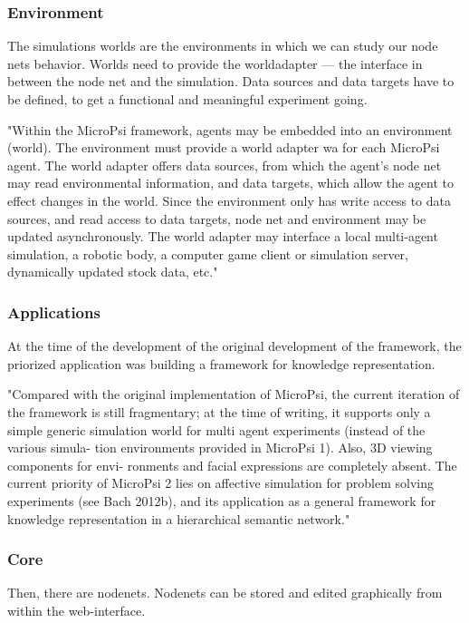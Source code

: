             \subsubsection{Environment}
The simulations worlds are the environments in which we can study our node nets behavior. Worlds need to provide the worldadapter --- the interface in between the node net and the simulation. Data sources and data targets have to be defined, to get a functional and meaningful experiment going.~\cite{conf/agi/Bach12}
                
"Within the MicroPsi framework, agents may be embedded into an environment (world). The environment must provide a world adapter wa for each MicroPsi agent. The world adapter offers data sources, from which the agent’s node net may read environmental information, and data targets, which allow the agent to effect changes in the world. Since the environment only has write access to data sources, and read access to data targets, node net and environment may be updated asynchronously.
The world adapter may interface a local multi-agent simulation, a robotic body, a computer game client or simulation server, dynamically updated stock data, etc."~\cite{conf/agi/Bach12}

            \subsubsection{Applications}
At the time of the development of the original development of the framework, the priorized application was building a framework for knowledge representation.~\cite{conf/agi/Bach12}

"Compared with the original implementation of MicroPsi, the current iteration of the framework is still fragmentary; at the time of writing, it supports only a simple generic simulation world for multi agent experiments (instead of the various simula- tion environments provided in MicroPsi 1). Also, 3D viewing components for envi- ronments and facial expressions are completely absent.
The current priority of MicroPsi 2 lies on affective simulation for problem solving experiments (see Bach 2012b), and its application as a general framework for knowledge representation in a hierarchical semantic network."~\cite{conf/agi/Bach12}


            \subsubsection{Core}
Then, there are nodenets. Nodenets can be stored and edited graphically from within the web-interface.

